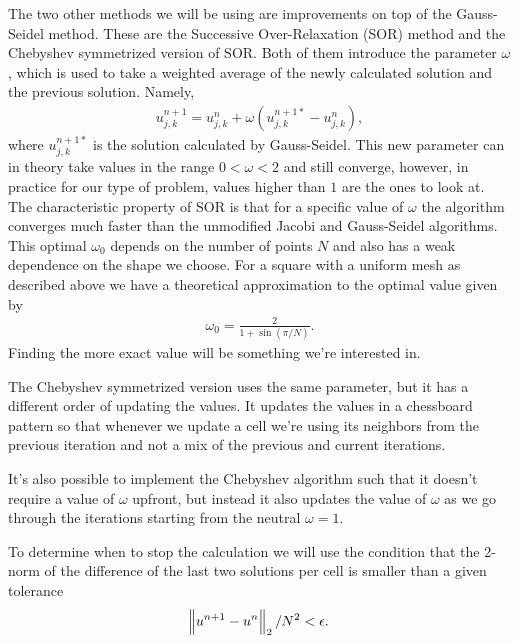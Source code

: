 \documentclass[10pt,a4paper,twocolumn]{article}
\begin{document}
The two other methods we will be using are improvements on top of the Gauss-Seidel method. These are the Successive Over-Relaxation (SOR) method and the Chebyshev symmetrized version of SOR. Both of them introduce the parameter $\omega$, which is used to take a weighted average of the newly calculated solution and the previous solution. Namely,
%
\begin{align}
    u_{j,k}^{n+1} = u_{j,k}^{n} + \omega (u_{j,k}^{n+1*} - u_{j,k}^{n}),
\end{align}
%
where $u_{j,k}^{n+1*}$ is the solution calculated by Gauss-Seidel. This new parameter can in theory take values in the range $0 < \omega < 2$ and still converge, however, in practice for our type of problem, values higher than $1$ are the ones to look at. The characteristic property of SOR is that for a specific value of $\omega$ the algorithm converges much faster than the unmodified Jacobi and Gauss-Seidel algorithms. This optimal $\omega_0$ depends on the number of points $N$ and also has a weak dependence on the shape we choose. For a square with a uniform mesh as described above we have a theoretical approximation to the optimal value given by
%
\begin{align}\label{eq:optimal_square}
    \omega_0 = \frac{2}{1 + \sin (\pi/N)}.
\end{align}
%
Finding the more exact value will be something we're interested in.

The Chebyshev symmetrized version \cite{cheb} uses the same parameter, but it has a different order of updating the values. It updates the values in a chessboard pattern so that whenever we update a cell we're using its neighbors from the previous iteration and not a mix of the previous and current iterations.

It's also possible to implement the Chebyshev algorithm such that it doesn't require a value of $\omega$ upfront, but instead it also updates the value of $\omega$ as we go through the iterations starting from the neutral $\omega=1$.

To determine when to stop the calculation we will use the condition that the 2-norm of the difference of the last two solutions per cell is smaller than a given tolerance
%
\begin{align}
    \norm{u^{n+1} - u^{n}}_2 / N^2 < \epsilon.
\end{align}
\end{document}
